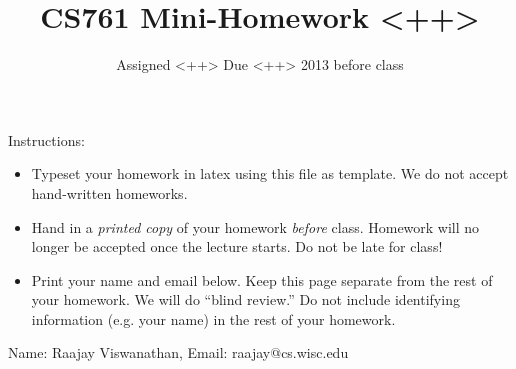 \documentclass{article}
\title{CS761 Mini-Homework <++>}
\author{Assigned <++> Due <++> 2013 before class}
\date{}
\begin{document}
\maketitle

Instructions: 
\begin{itemize}
\item Typeset your homework in latex using this file as template.  
  We do not accept hand-written homeworks.
\item Hand in a \emph{printed copy} of your homework \emph{before} class.  
  Homework will no longer be accepted once the lecture starts.  
  Do not be late for class!
\item Print your name and email below.  
  Keep this page separate from the rest of your homework.  
  We will do ``blind review.''  
  Do not include identifying information (e.g. your name)
  in the rest of your homework.
\end{itemize}


Name: Raajay Viswanathan, Email: raajay@cs.wisc.edu


\newpage %
\mbox{}
\newpage %
\mbox{}

\begin{enumerate}



\end{enumerate}
\end{document}
